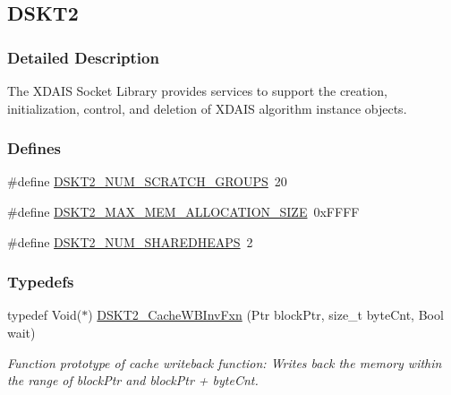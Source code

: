 \hypertarget{group___d_s_p_d_s_k_t2}{
\subsection{DSKT2}
\label{group___d_s_p_d_s_k_t2}
}


\subsubsection{Detailed Description}
The XDAIS Socket Library provides services to support the creation, initialization, control, and deletion of XDAIS algorithm instance objects. 

\subsubsection*{Defines}
\begin{CompactItemize}
\item 
\#define \hyperlink{group___d_s_p_d_s_k_t2_g6ea3f0bc0c9a697930cf7d8411975ac2}{DSKT2\_\-NUM\_\-SCRATCH\_\-GROUPS}~20
\item 
\#define \hyperlink{group___d_s_p_d_s_k_t2_gb7906673f1c60a08206bd37c7f7d1178}{DSKT2\_\-MAX\_\-MEM\_\-ALLOCATION\_\-SIZE}~0x\-FFFF
\item 
\#define \hyperlink{group___d_s_p_d_s_k_t2_gcb5e98129cb03f61436195c9fd240804}{DSKT2\_\-NUM\_\-SHAREDHEAPS}~2
\end{CompactItemize}
\subsubsection*{Typedefs}
\begin{CompactItemize}
\item 
typedef Void($\ast$) \hyperlink{group___d_s_p_d_s_k_t2_gc2be66a39e491bc30ef6f01d7a0a4361}{DSKT2\_\-Cache\-WBInv\-Fxn} (Ptr block\-Ptr, size\_\-t byte\-Cnt, Bool wait)
\begin{CompactList}\small\item\em Function prototype of cache writeback function: Writes back the memory within the range of block\-Ptr and block\-Ptr + byte\-Cnt. \item\end{CompactList}\end{CompactItemize}
